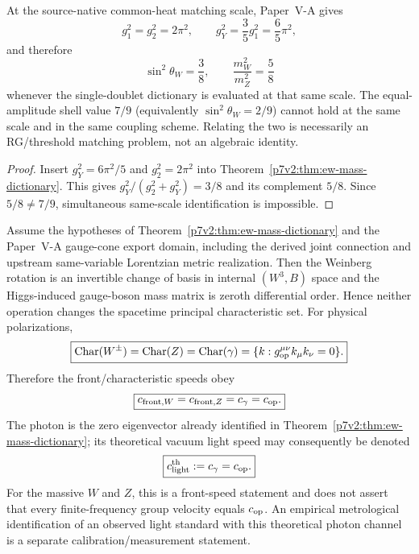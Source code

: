 \documentclass[12pt,a4paper]{article}
\begin{document}
\begin{corollary}
\label{p7:cor:common-heat-tree-shell-firewall}
At the source-native common-heat matching scale, Paper~V-A gives
\begin{equation}
 g_1^2=g_2^2=2\pi^2,
 \qquad g_Y^2=\frac35g_1^2=\frac65\pi^2,
\end{equation}
and therefore
\begin{equation}
 \label{p7:eq:common-heat-ew-ratio}
 \sin^2\theta_W=\frac38,
 \qquad
 \frac{m_W^2}{m_Z^2}=\frac58
\end{equation}
whenever the single-doublet dictionary is evaluated at that same scale.
The equal-amplitude shell value \(7/9\) (equivalently
\(\sin^2\theta_W=2/9\)) cannot hold at the same scale and in the same
coupling scheme.  Relating the two is necessarily an RG/threshold matching
problem, not an algebraic identity.
\end{corollary}

\begin{proof}
Insert \(g_Y^2=6\pi^2/5\) and \(g_2^2=2\pi^2\) into
Theorem~\ref{p7v2:thm:ew-mass-dictionary}.  This gives
\(g_Y^2/(g_2^2+g_Y^2)=3/8\) and its complement \(5/8\).
Since \(5/8\ne7/9\), simultaneous same-scale identification is impossible.
\end{proof}


\begin{theorem}
\label{p7v2:thm:electroweak-characteristic-cone-inheritance}
Assume the hypotheses of
Theorem~\ref{p7v2:thm:ew-mass-dictionary} and the Paper~V-A gauge-cone export
domain, including the derived joint connection and upstream same-variable
Lorentzian metric realization.  Then the Weinberg rotation is an invertible
change of basis in internal \((W^3,B)\) space and the Higgs-induced gauge-boson
mass matrix is zeroth differential order.  Hence neither operation changes the
spacetime principal characteristic set.  For physical polarizations,
\[
 \boxed{
 \operatorname{Char}(W^\pm)=\operatorname{Char}(Z)=\operatorname{Char}(\gamma)
 =\{k:g_{\rm op}^{\mu\nu}k_\mu k_\nu=0\}.}
\]
Therefore the front/characteristic speeds obey
\[
 \boxed{
 c_{{\rm front},W}=c_{{\rm front},Z}=c_\gamma=c_{\rm op}.}
\]
The photon is the zero eigenvector already identified in
Theorem~\ref{p7v2:thm:ew-mass-dictionary}; its theoretical vacuum light speed
may consequently be denoted
\[
 \boxed{c_{\rm light}^{\rm th}:=c_\gamma=c_{\rm op}.}
\]
For the massive \(W\) and \(Z\), this is a front-speed statement and does not
assert that every finite-frequency group velocity equals \(c_{\rm op}\).  An
empirical metrological identification of an observed light standard with this
theoretical photon channel is a separate calibration/measurement statement.
\end{theorem}
\end{document}
